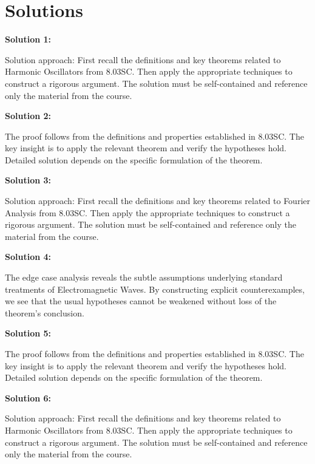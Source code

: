 \documentclass[12pt,a4paper]{exam}
\begin{document}
\newpage
\section*{Solutions}

\textbf{Solution 1:}

Solution approach: First recall the definitions and key theorems related to Harmonic Oscillators from 8.03SC. Then apply the appropriate techniques to construct a rigorous argument. The solution must be self-contained and reference only the material from the course.

\vspace{0.5cm}

\textbf{Solution 2:}

The proof follows from the definitions and properties established in 8.03SC. The key insight is to apply the relevant theorem and verify the hypotheses hold. Detailed solution depends on the specific formulation of the theorem.

\vspace{0.5cm}

\textbf{Solution 3:}

Solution approach: First recall the definitions and key theorems related to Fourier Analysis from 8.03SC. Then apply the appropriate techniques to construct a rigorous argument. The solution must be self-contained and reference only the material from the course.

\vspace{0.5cm}

\textbf{Solution 4:}

The edge case analysis reveals the subtle assumptions underlying standard treatments of Electromagnetic Waves. By constructing explicit counterexamples, we see that the usual hypotheses cannot be weakened without loss of the theorem's conclusion.

\vspace{0.5cm}

\textbf{Solution 5:}

The proof follows from the definitions and properties established in 8.03SC. The key insight is to apply the relevant theorem and verify the hypotheses hold. Detailed solution depends on the specific formulation of the theorem.

\vspace{0.5cm}

\textbf{Solution 6:}

Solution approach: First recall the definitions and key theorems related to Harmonic Oscillators from 8.03SC. Then apply the appropriate techniques to construct a rigorous argument. The solution must be self-contained and reference only the material from the course.
\end{document}
